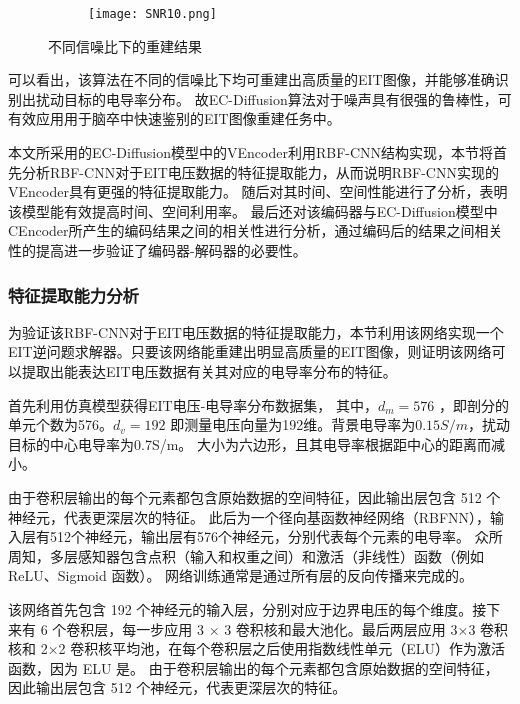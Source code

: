\newcommand{\subfiggggg}{
\begin{subfigure}[b]{0.8\linewidth}
\centering
\texttt{[image: SNR10.png]}
\subcaption{信噪比为10时的重建结果}
\end{subfigure}
\label{subfigure:SNR30}
}

\begin{figure}[H]
    \subfigg
    \subfiggg
    \subfigggg
    \subfiggggg
    \caption{不同信噪比下的重建结果}
    \label{fig:SNR}
\end{figure}

可以看出，该算法在不同的信噪比下均可重建出高质量的EIT图像，并能够准确识别出扰动目标的电导率分布。
故EC-Diffusion算法对于噪声具有很强的鲁棒性，可有效应用用于脑卒中快速鉴别的EIT图像重建任务中。


本文所采用的EC-Diffusion模型中的VEncoder利用RBF-CNN结构实现，本节将首先分析RBF-CNN对于EIT电压数据的特征提取能力，从而说明RBF-CNN实现的VEncoder具有更强的特征提取能力。
随后对其时间、空间性能进行了分析，表明该模型能有效提高时间、空间利用率。
最后还对该编码器与EC-Diffusion模型中CEncoder所产生的编码结果之间的相关性进行分析，通过编码后的结果之间相关性的提高进一步验证了编码器-解码器的必要性。

\subsubsection{特征提取能力分析}

为验证该RBF-CNN对于EIT电压数据的特征提取能力，本节利用该网络实现一个EIT逆问题求解器。只要该网络能重建出明显高质量的EIT图像，则证明该网络可以提取出能表达EIT电压数据有关其对应的电导率分布的特征。

首先利用仿真模型获得EIT电压-电导率分布数据集，
其中，$d_m =  576$ ，即剖分的单元个数为576。$d_v = 192$ 即测量电压向量为192维。背景电导率为$0.15S/m$，扰动目标的中心电导率为0.7S/m。
大小为六边形，且其电导率根据距中心的距离而减小。


由于卷积层输出的每个元素都包含原始数据的空间特征，因此输出层包含 512 个神经元，代表更深层次的特征。
此后为一个径向基函数神经网络（RBFNN），输入层有512个神经元，输出层有576个神经元，分别代表每个元素的电导率。
众所周知，多层感知器包含点积（输入和权重之间）和激活（非线性）函数（例如 ReLU、Sigmoid 函数）。
网络训练通常是通过所有层的反向传播来完成的。

该网络首先包含 192 个神经元的输入层，分别对应于边界电压的每个维度。接下来有 6 个卷积层，每一步应用 3 × 3 卷积核和最大池化。最后两层应用 3×3 卷积核和 2×2 卷积核平均池，在每个卷积层之后使用指数线性单元（ELU）作为激活函数，因为 ELU 是。
由于卷积层输出的每个元素都包含原始数据的空间特征，因此输出层包含 512 个神经元，代表更深层次的特征。

